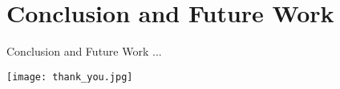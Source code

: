 \section{Conclusion and Future Work}

\begin{frame}{Conclusion and Future Work}
	...
\end{frame}

\begin{frame}
	\begin{center}
		\texttt{[image: thank\_you.jpg]}
	\end{center}	
\end{frame}